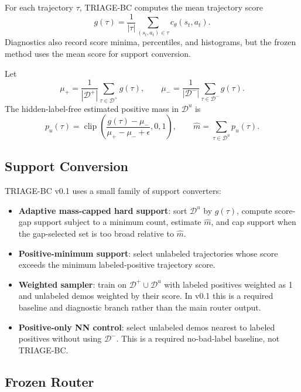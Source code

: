 \documentclass[11pt]{article}
\newcommand{\Dpos}{\mathcal{D}^{+}}
\newcommand{\Dneg}{\mathcal{D}^{-}}
\newcommand{\Dunl}{\mathcal{D}^{u}}
\newcommand{\clip}{\operatorname{clip}}
\newcommand{\method}{TRIAGE-BC}
\begin{document}
For each trajectory $\tau$, \method{} computes the mean trajectory score
\begin{equation}
  g(\tau) = \frac{1}{|\tau|}\sum_{(s_t,a_t)\in\tau} c_\theta(s_t,a_t).
\end{equation}
Diagnostics also record score minima, percentiles, and histograms, but the frozen method uses the mean score for support conversion.

Let
\begin{equation}
  \mu_+ = \frac{1}{|\Dpos|}\sum_{\tau\in\Dpos} g(\tau),
  \qquad
  \mu_- = \frac{1}{|\Dneg|}\sum_{\tau\in\Dneg} g(\tau).
\end{equation}
The hidden-label-free estimated positive mass in $\Dunl$ is
\begin{equation}
  p_u(\tau)
  =
  \clip\left(
    \frac{g(\tau)-\mu_-}{\mu_+-\mu_-+\epsilon},
    0, 1
  \right),
  \qquad
  \hat{m} = \sum_{\tau\in\Dunl} p_u(\tau).
\end{equation}

\subsection{Support Conversion}

\method{} v0.1 uses a small family of support converters:
\begin{itemize}[leftmargin=*]
  \item \textbf{Adaptive mass-capped hard support}: sort $\Dunl$ by $g(\tau)$, compute score-gap support subject to a minimum count, estimate $\hat{m}$, and cap support when the gap-selected set is too broad relative to $\hat{m}$.
  \item \textbf{Positive-minimum support}: select unlabeled trajectories whose score exceeds the minimum labeled-positive trajectory score.
  \item \textbf{Weighted sampler}: train on $\Dpos \cup \Dunl$ with labeled positives weighted as 1 and unlabeled demos weighted by their score. In v0.1 this is a required baseline and diagnostic branch rather than the main router output.
  \item \textbf{Positive-only NN control}: select unlabeled demos nearest to labeled positives without using $\Dneg$. This is a required no-bad-label baseline, not \method{}.
\end{itemize}

\subsection{Frozen Router}
\end{document}
